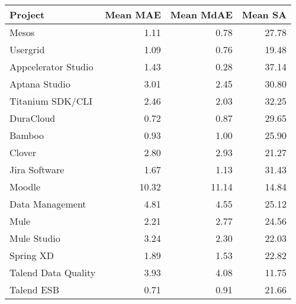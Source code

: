 \begin{tabular}{lrrr}
\toprule
             Project &  Mean MAE &  Mean MdAE &  Mean SA \\
\midrule
               Mesos &      1.11 &       0.78 &    27.78 \\
            Usergrid &      1.09 &       0.76 &    19.48 \\
 Appcelerator Studio &      1.43 &       0.28 &    37.14 \\
       Aptana Studio &      3.01 &       2.45 &    30.80 \\
    Titanium SDK/CLI &      2.46 &       2.03 &    32.25 \\
           DuraCloud &      0.72 &       0.87 &    29.65 \\
              Bamboo &      0.93 &       1.00 &    25.90 \\
              Clover &      2.80 &       2.93 &    21.27 \\
       Jira Software &      1.67 &       1.13 &    31.43 \\
              Moodle &     10.32 &      11.14 &    14.84 \\
     Data Management &      4.81 &       4.55 &    25.12 \\
                Mule &      2.21 &       2.77 &    24.56 \\
         Mule Studio &      3.24 &       2.30 &    22.03 \\
           Spring XD &      1.89 &       1.53 &    22.82 \\
 Talend Data Quality &      3.93 &       4.08 &    11.75 \\
          Talend ESB &      0.71 &       0.91 &    21.66 \\
\bottomrule
\end{tabular}
